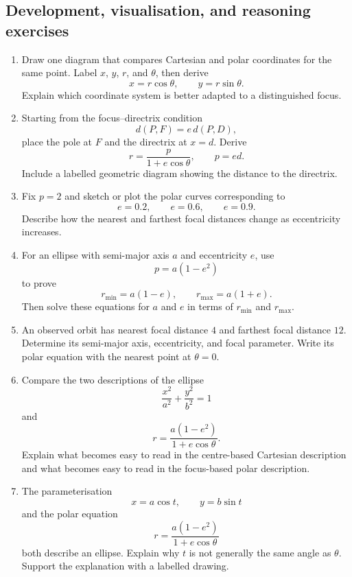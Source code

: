 \subsection{Development, visualisation, and reasoning exercises}

\begin{enumerate}

\item Draw one diagram that compares Cartesian and polar coordinates for the same
point. Label $x$, $y$, $r$, and $\theta$, then derive
\[
x=r\cos\theta,
\qquad
y=r\sin\theta.
\]
Explain which coordinate system is better adapted to a distinguished focus.

\item Starting from the focus--directrix condition
\[
d(P,F)=e\,d(P,D),
\]
place the pole at $F$ and the directrix at $x=d$. Derive
\[
r=\frac{p}{1+e\cos\theta},
\qquad p=ed.
\]
Include a labelled geometric diagram showing the distance to the directrix.

\item Fix $p=2$ and sketch or plot the polar curves corresponding to
\[
e=0.2,
\qquad e=0.6,
\qquad e=0.9.
\]
Describe how the nearest and farthest focal distances change as eccentricity
increases.

\item For an ellipse with semi-major axis $a$ and eccentricity $e$, use
\[
p=a(1-e^2)
\]
to prove
\[
r_{\min}=a(1-e),
\qquad
r_{\max}=a(1+e).
\]
Then solve these equations for $a$ and $e$ in terms of $r_{\min}$ and
$r_{\max}$.

\item An observed orbit has nearest focal distance $4$ and farthest focal distance
$12$. Determine its semi-major axis, eccentricity, and focal parameter. Write its
polar equation with the nearest point at $\theta=0$.

\item Compare the two descriptions of the ellipse
\[
\frac{x^2}{a^2}+\frac{y^2}{b^2}=1
\]
and
\[
r=\frac{a(1-e^2)}{1+e\cos\theta}.
\]
Explain what becomes easy to read in the centre-based Cartesian description and
what becomes easy to read in the focus-based polar description.

\item The parameterisation
\[
x=a\cos t,
\qquad
y=b\sin t
\]
and the polar equation
\[
r=\frac{a(1-e^2)}{1+e\cos\theta}
\]
both describe an ellipse. Explain why $t$ is not generally the same angle as
$\theta$. Support the explanation with a labelled drawing.


\end{enumerate}
